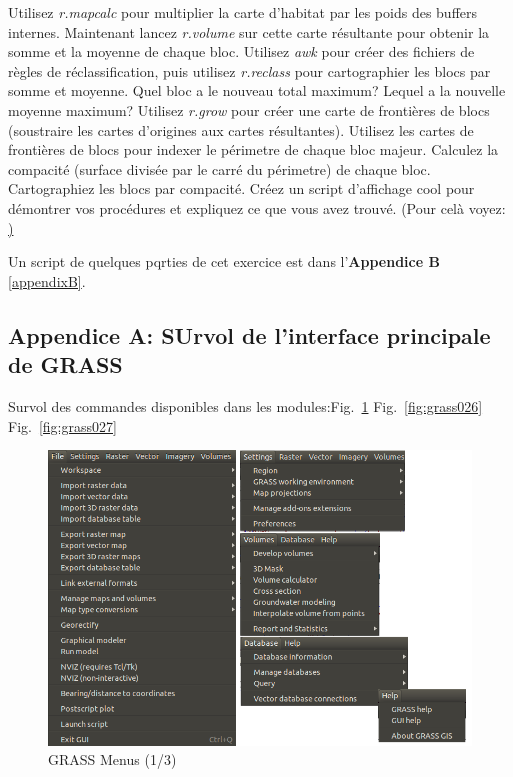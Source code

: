 Utilisez \textit{r.mapcalc} pour multiplier la carte d'habitat par les poids des buffers internes.
Maintenant lancez \textit{r.volume }sur cette carte r\'esultante pour obtenir la somme et la moyenne de chaque bloc.
Utilisez  \textit{awk} pour cr\'eer des fichiers de r\`egles de r\'eclassification, puis utilisez \textit{r.reclass} pour cartographier les blocs par somme et moyenne.
Quel bloc a le nouveau total maximum? Lequel a la nouvelle moyenne maximum?
Utilisez \textit{r.grow} pour cr\'eer une carte de fronti\`eres de blocs (soustraire les cartes d'origines aux cartes r\'esultantes).
Utilisez les cartes de fronti\`eres de blocs pour indexer le p\'erimetre de chaque bloc majeur. 
Calculez la compacit\'e (surface divis\'ee par le carr\'e du p\'erimetre) de chaque bloc. 
Cartographiez les blocs par compacit\'e. Cr\'eez un script d'affichage cool pour d\'emontrer vos proc\'edures et expliquez ce que vous avez trouv\'e.
(Pour cel\`a voyez: \href{http://www.udel.edu/johnmack/frec682/script_ideas.html})

Un script de quelques pqrties de cet exercice est dans l'\textbf{Appendice B} \ref{appendixB}.

\newpage

\subsection{Appendice A: SUrvol de l'interface principale de GRASS}
\label{appendixA}

Survol des commandes disponibles dans les modules:Fig.~\ref{fig:grass025} Fig.~\ref{fig:grass026} Fig.~\ref{fig:grass027}

\begin{figure}[htbp]
   \centering
   \includegraphics[scale=0.4]{grass025.png}
   \caption{GRASS Menus (1/3)}
   \label{fig:grass025}
\end{figure}

